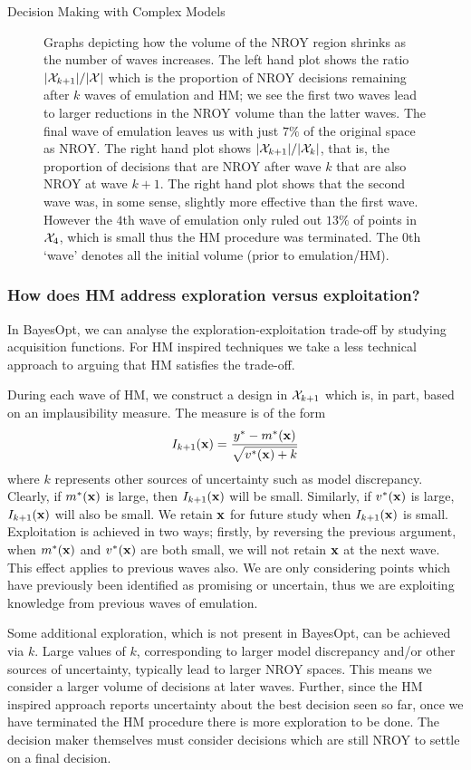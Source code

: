 \begin{chapter}{Decision Making with Complex Models \label{Chap:optimisation}}
\begin{figure}
 \caption{Graphs depicting how the volume of the NROY region shrinks as the number of waves increases. The left hand plot shows the ratio $|\mathcal{X}_{k+1}|/|\mathcal{X}|$ which is the proportion of NROY decisions remaining after $k$ waves of emulation and HM; we see the first two waves lead to larger reductions in the NROY volume than the latter waves. The final wave of emulation leaves us with just $7\%$ of the original space as NROY. The right hand plot shows $|\mathcal{X}_{k+1}|/|\mathcal{X}_k|$, that is, the proportion of decisions that are NROY after wave $k$ that are also NROY at wave $k+1$. The right hand plot shows that the second wave was, in some sense, slightly more effective than the first wave. However the $4$th wave of emulation only ruled out $13\%$ of points in $\mathcal{X}_4$, which is small thus the HM procedure was terminated. The $0$th `wave' denotes all the initial volume (prior to emulation/HM).\label{fig:nroy-numbers}}
\end{figure}

\subsubsection{How does HM address exploration versus exploitation?}

In BayesOpt, we can analyse the exploration-exploitation trade-off by studying acquisition functions. For HM inspired techniques we take a less technical approach to arguing that HM satisfies the trade-off.

During each wave of HM, we construct a design in $\mathcal{X}_{k+1}$ which is, in part, based on an implausibility measure. The measure is of the form
\begin{equation}
 I_{k+1}(\mathbf{x}) = \frac{y^{*} - m^{*}(\mathbf{x})}{ \sqrt{v^{*}(\mathbf{x}) + k} }
\end{equation}
where $k$ represents other sources of uncertainty such as model discrepancy. Clearly, if $m^{*}(\mathbf{x})$ is large, then $I_{k+1}(\mathbf{x})$ will be small. Similarly, if $v^{*}(\mathbf{x})$ is large, $I_{k+1}(\mathbf{x})$ will also be small. We retain $\mathbf{x}$ for future study when $I_{k+1}(\mathbf{x})$ is small. Exploitation is achieved in two ways; firstly, by reversing the previous argument, when $m^{*}(\mathbf{x})$ and $v^{*}(\mathbf{x})$ are both small, we will not retain $\mathbf{x}$ at the next wave. This effect applies to previous waves also. We are only considering points which have previously been identified as promising or uncertain, thus we are exploiting knowledge from previous waves of emulation.

Some additional exploration, which is not present in BayesOpt, can be achieved via $k$. Large values of $k$, corresponding to larger model discrepancy and/or other sources of uncertainty, typically lead to larger NROY spaces. This means we consider a larger volume of decisions at later waves. Further, since the HM inspired approach reports uncertainty about the best decision seen so far, once we have terminated the HM procedure there is more exploration to be done. The decision maker themselves must consider decisions which are still NROY to settle on a final decision.



\end{chapter}
